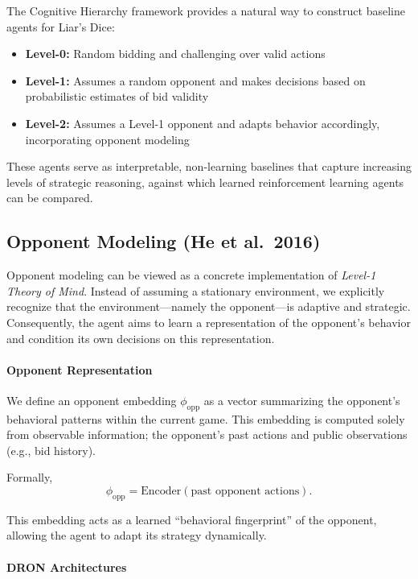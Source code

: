 \documentclass{article}
\begin{document}
The Cognitive Hierarchy framework provides a natural way to construct baseline agents for Liar’s Dice:
\begin{itemize}
    \item \textbf{Level-0:} Random bidding and challenging over valid actions
    \item \textbf{Level-1:} Assumes a random opponent and makes decisions based on probabilistic estimates of bid validity
    \item \textbf{Level-2:} Assumes a Level-1 opponent and adapts behavior accordingly, incorporating opponent modeling
\end{itemize}

These agents serve as interpretable, non-learning baselines that capture increasing levels of strategic reasoning, against which learned reinforcement learning agents can be compared.


\subsection{Opponent Modeling (He et al.\ 2016)}

Opponent modeling can be viewed as a concrete implementation of \emph{Level-1 Theory of Mind}. Instead of assuming a stationary environment, we explicitly recognize that the environment---namely the opponent---is adaptive and strategic. Consequently, the agent aims to learn a representation of the opponent’s behavior and condition its own decisions on this representation.

\paragraph{Opponent Representation}

We define an opponent embedding $\phi_{\text{opp}}$ as a vector summarizing the opponent’s behavioral patterns within the current game. This embedding is computed solely from observable information; the opponent’s past actions and public observations (e.g., bid history).

Formally,
\[
\phi_{\text{opp}} = \text{Encoder}(\text{past opponent actions}).
\]

This embedding acts as a learned ``behavioral fingerprint'' of the opponent, allowing the agent to adapt its strategy dynamically.

\paragraph{DRON Architectures}
\end{document}
